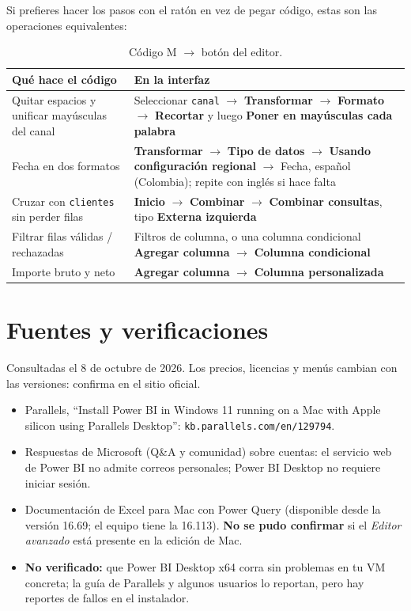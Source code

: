 \documentclass[11pt,letterpaper]{article}
\newcommand{\ui}[1]{\textbf{#1}}                 %
\begin{document}
Si prefieres hacer los pasos con el ratón en vez de pegar código, estas son las operaciones equivalentes:

\begin{table}[H]
\centering
\caption{Código M $\rightarrow$ botón del editor.}
\begin{tabularx}{\linewidth}{L L}
\toprule
Qué hace el código & En la interfaz \\
\midrule
Quitar espacios y unificar mayúsculas del canal & Seleccionar \texttt{canal} $\rightarrow$ \ui{Transformar} $\rightarrow$ \ui{Formato} $\rightarrow$ \ui{Recortar} y luego \ui{Poner en mayúsculas cada palabra} \\
Fecha en dos formatos & \ui{Transformar} $\rightarrow$ \ui{Tipo de datos} $\rightarrow$ \ui{Usando configuración regional} $\rightarrow$ Fecha, español (Colombia); repite con inglés si hace falta \\
Cruzar con \texttt{clientes} sin perder filas & \ui{Inicio} $\rightarrow$ \ui{Combinar} $\rightarrow$ \ui{Combinar consultas}, tipo \ui{Externa izquierda} \\
Filtrar filas válidas / rechazadas & Filtros de columna, o una columna condicional \ui{Agregar columna} $\rightarrow$ \ui{Columna condicional} \\
Importe bruto y neto & \ui{Agregar columna} $\rightarrow$ \ui{Columna personalizada} \\
\bottomrule
\end{tabularx}
\end{table}

\section*{Fuentes y verificaciones}

Consultadas el 8 de octubre de 2026. Los precios, licencias y menús cambian con las versiones: confirma en el sitio oficial.

\begin{itemize}\small
  \item Parallels, ``Install Power BI in Windows 11 running on a Mac with Apple silicon using Parallels Desktop'': \texttt{kb.parallels.com/en/129794}.
  \item Respuestas de Microsoft (Q\&A y comunidad) sobre cuentas: el servicio web de Power BI no admite correos personales; Power BI Desktop no requiere iniciar sesión.
  \item Documentación de Excel para Mac con Power Query (disponible desde la versión 16.69; el equipo tiene la 16.113). \textbf{No se pudo confirmar} si el \emph{Editor avanzado} está presente en la edición de Mac.
  \item \textbf{No verificado:} que Power BI Desktop x64 corra sin problemas en tu VM concreta; la guía de Parallels y algunos usuarios lo reportan, pero hay reportes de fallos en el instalador.
\end{itemize}
\end{document}
